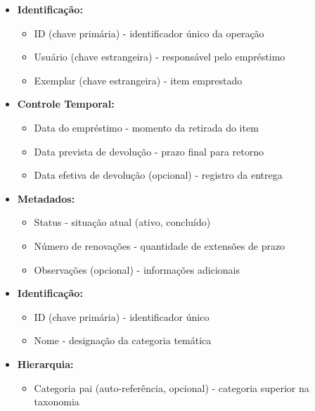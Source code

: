 \documentclass[12pt,a4paper]{article}
\begin{document}
\begin{conceptbox}[Empréstimo]
\begin{itemize}[leftmargin=*]
    \item \textbf{Identificação:}
    \begin{itemize}
        \item ID (chave primária) - identificador único da operação
        \item Usuário (chave estrangeira) - responsável pelo empréstimo
        \item Exemplar (chave estrangeira) - item emprestado
    \end{itemize}
    \item \textbf{Controle Temporal:}
    \begin{itemize}
        \item Data do empréstimo - momento da retirada do item
        \item Data prevista de devolução - prazo final para retorno
        \item Data efetiva de devolução (opcional) - registro da entrega
    \end{itemize}
    \item \textbf{Metadados:}
    \begin{itemize}
        \item Status - situação atual (ativo, concluído)
        \item Número de renovações - quantidade de extensões de prazo
        \item Observações (opcional) - informações adicionais
    \end{itemize}
\end{itemize}
\end{conceptbox}

\begin{conceptbox}[Categoria]
\begin{itemize}[leftmargin=*]
    \item \textbf{Identificação:}
    \begin{itemize}
        \item ID (chave primária) - identificador único
        \item Nome - designação da categoria temática
    \end{itemize}
    \item \textbf{Hierarquia:}
    \begin{itemize}
        \item Categoria pai (auto-referência, opcional) - categoria superior na taxonomia
    \end{itemize}
\end{itemize}
\end{conceptbox}
\end{document}
